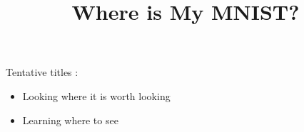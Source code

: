 \documentclass[]{article}
\title{Where is My MNIST?}
\author{}
\begin{document}
\maketitle

Tentative titles :
\begin{itemize}
	\item Looking where it is worth looking
	\item Learning where to see
\end{itemize}

\begin{abstract}

\end{abstract}










\end{document}
